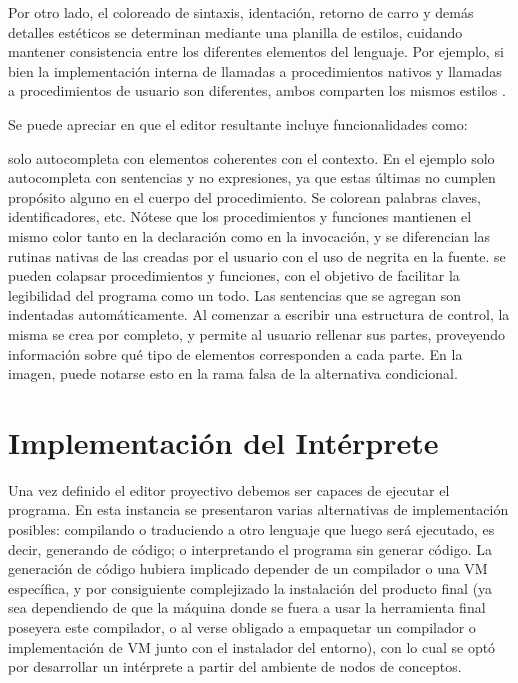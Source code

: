 Por otro lado, el coloreado de sintaxis, identación, retorno de carro y demás detalles estéticos se determinan mediante una planilla de estilos, cuidando mantener consistencia entre los diferentes elementos del lenguaje. Por ejemplo, si bien la implementación interna de llamadas a procedimientos nativos y llamadas a procedimientos de usuario son diferentes, ambos comparten los mismos estilos .


Se puede apreciar en  que el editor resultante incluye funcionalidades como:
\begin{itemize}
 solo autocompleta con elementos coherentes con el contexto. En el ejemplo solo autocompleta con sentencias y no expresiones, ya que estas últimas no cumplen propósito alguno en el cuerpo del procedimiento.
 Se colorean palabras claves, identificadores, etc. Nótese que los procedimientos y funciones mantienen el mismo color tanto en la declaración como en la invocación, y se diferencian las rutinas nativas de las creadas por el usuario con el uso de negrita en la fuente.
 se pueden colapsar procedimientos y funciones, con el objetivo de facilitar la legibilidad del programa como un todo.
 Las sentencias que se agregan son indentadas automáticamente.
 Al comenzar a escribir una estructura de control, la misma se crea por completo, y permite al usuario rellenar sus partes, proveyendo información sobre qué tipo de elementos corresponden a cada parte. En la imagen, puede notarse esto en la rama falsa de la alternativa condicional.
\end{itemize}





\section{Implementación del Intérprete}\label{interprete}

Una vez definido el editor proyectivo debemos ser capaces de ejecutar el programa. En esta instancia se presentaron varias alternativas de implementación posibles: compilando o traduciendo a otro lenguaje que luego será ejecutado, es decir, generando de código; o interpretando el programa sin generar código. La generación de código hubiera implicado depender de un compilador o una VM específica, y por consiguiente complejizado la instalación del producto final (ya sea dependiendo de que la máquina donde se fuera a usar la herramienta final poseyera este compilador, o al verse obligado a empaquetar un compilador o implementación de VM junto con el instalador del entorno), con lo cual se optó por desarrollar un intérprete a partir del ambiente de nodos de conceptos.

